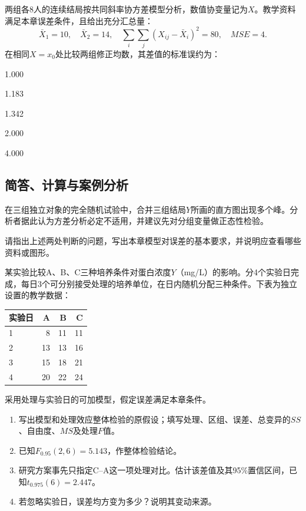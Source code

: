 \par\noindent\begin{minipage}{\linewidth}
两组各8人的连续结局按共同斜率协方差模型分析，数值协变量记为\(X\)。教学资料满足本章误差条件，且给出充分汇总量：
\[
\bar X_1=10,\quad\bar X_2=14,\quad
\sum_i\sum_j(X_{ij}-\bar X_i)^2=80,\quad MSE=4.
\]
在相同\(X=x_0\)处比较两组修正均数，其差值的标准误约为：
\begin{choices}
\item 1.000
\item 1.183
\item 1.342
\item 2.000
\item 4.000
\end{choices}
\end{minipage}\par\medskip

\subsection{简答、计算与案例分析}

在三组独立对象的完全随机试验中，合并三组结局\(Y\)所画的直方图出现多个峰。分析者据此认为方差分析必定不适用，并建议先对分组变量做正态性检验。

请指出上述两处判断的问题，写出本章模型对误差的基本要求，并说明应查看哪些资料或图形。

某实验比较A、B、C三种培养条件对蛋白浓度\(Y\)（mg/L）的影响。分4个实验日完成，每日3个可分别接受处理的培养单位，在日内随机分配三种条件。下表为独立设置的教学数据：
\begin{center}\begin{tabular}{lrrr}
\toprule 实验日&A&B&C\\\midrule
1&8&11&11\\
2&13&13&16\\
3&15&18&21\\
4&20&22&24\\\bottomrule
\end{tabular}\end{center}
采用处理与实验日的可加模型，假定误差满足本章条件。
\begin{enumerate}
\item 写出模型和处理效应整体检验的原假设；填写处理、区组、误差、总变异的\(SS\)、自由度、\(MS\)及处理\(F\)值。
\item 已知\(F_{0.95}(2,6)=5.143\)，作整体检验结论。
\item 研究方案事先只指定C--A这一项处理对比。估计该差值及其95\%置信区间，已知\(t_{0.975}(6)=2.447\)。
\item 若忽略实验日，误差均方变为多少？说明其变动来源。
\end{enumerate}

